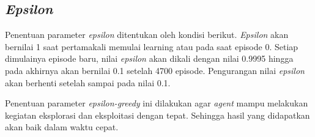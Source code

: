 \subsection{\textit{Epsilon}}

\begin{table}[H]
	\caption{Hyperparameter epsilon.}
	\label{tb:hyperparameter_epsilon}
\end{table}
Penentuan parameter \textit{epsilon} ditentukan oleh kondisi berikut. \textit{Epsilon} akan bernilai 1 saat pertamakali memulai learning atau pada saat episode 0. Setiap dimulainya episode baru, nilai \textit{epsilon} akan dikali dengan nilai 0.9995 hingga pada akhirnya akan bernilai 0.1 setelah 4700 episode. Pengurangan nilai \textit{epsilon} akan berhenti setelah sampai pada nilai 0.1.

Penentuan parameter \textit{epsilon-greedy} ini dilakukan agar \textit{agent} mampu melakukan kegiatan eksplorasi dan eksploitasi dengan tepat. Sehingga hasil yang didapatkan akan baik dalam waktu cepat.
\label{sec:epsilon}

